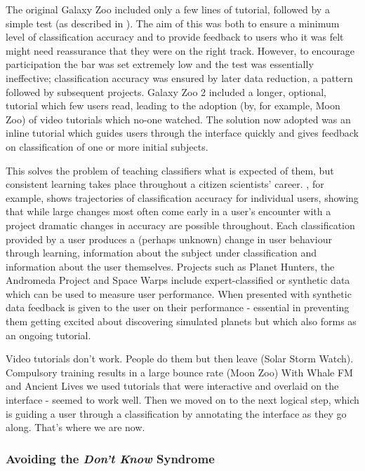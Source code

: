 \documentclass{sigchi}
\begin{document}
The original Galaxy Zoo included only a few lines of tutorial, followed by a simple test (as described in \cite{Lintott}). The aim of this was both to ensure a minimum level of classification accuracy and to provide feedback to users who it was felt might need reassurance that they were on the right track. However, to encourage participation the bar was set extremely low and the test was essentially ineffective; classification accuracy was ensured by later data reduction, a pattern followed by subsequent projects. Galaxy Zoo 2 included a longer, optional, tutorial which few users read, leading to the adoption (by, for example, Moon Zoo) of video tutorials which no-one watched. The solution now adopted was an inline tutorial which guides users through the interface quickly and gives feedback on classification of one or more initial subjects.

This solves the problem of teaching classifiers what is expected of them, but consistent learning takes place throughout a citizen scientists' career. \cite{Smith}, for example, shows trajectories of classification accuracy for individual users, showing that while large changes most often come early in a user's encounter with a project dramatic changes in accuracy are possible throughout. Each classification provided by a user produces a (perhaps unknown) change in user behaviour through learning, information about the subject under classification and information about the user themselves. Projects such as Planet Hunters, the Andromeda Project and Space Warps include expert-classified or synthetic data which can be used to measure user performance. When presented with synthetic data feedback is given to the user on their performance - essential in preventing them getting excited about discovering simulated planets but which also forms as an ongoing tutorial. 

Video tutorials don't work. People do them but then leave (Solar Storm Watch). %
Compulsory training results in a large bounce rate (Moon Zoo) %
With Whale FM and Ancient Lives we used tutorials that were interactive and overlaid on the interface - seemed to work well.
Then we moved on to the next logical step, which is guiding a user through a classification by annotating the interface as they go along. That's where we are now. %

\subsubsection{Avoiding the \emph{Don't Know} Syndrome}
\end{document}
